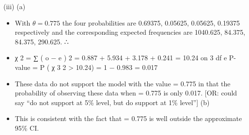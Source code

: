 \documentclass[a4paper,12pt]{article}
\begin{document}
 (iii)
(a)
\begin{itemize}
    \item With $\theta = 0.775$ the four probabilities are 0.69375, 0.05625, 0.05625, 0.19375 respectively
and the corresponding expected frequencies are 1040.625, 84.375, 84.375, 290.625.
∴\item χ 2 = ∑
( o − e ) 2
= 0.887 + 5.934 + 3.178 + 0.241 = 10.24 on 3 df
e
P-value = P ( χ 3 2 > 10.24) = 1 − 0.983 = 0.017
\item These data do not support the model with the value \theta = 0.775 in that the probability of observing these data when \theta = 0.775 is only 0.017.
[OR: could say “do not support at 5\% level, but do support at 1\% level”]
(b)
\item This is consistent with the fact that \theta = 0.775 is well outside the approximate 95\% CI.
\end{itemize}
\end{document}
